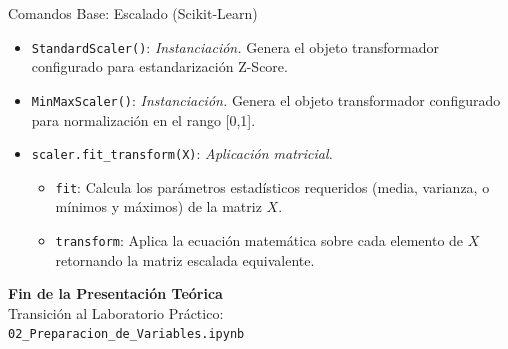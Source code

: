 \documentclass{beamer}
\begin{document}
\begin{frame}[fragile]{Comandos Base: Escalado (Scikit-Learn)}
    \begin{itemize}
        \item \verb|StandardScaler()|: \textit{Instanciación.} Genera el objeto transformador configurado para estandarización Z-Score.
        \item \verb|MinMaxScaler()|: \textit{Instanciación.} Genera el objeto transformador configurado para normalización en el rango [0,1].
        \item \verb|scaler.fit_transform(X)|: \textit{Aplicación matricial.} 
        \begin{itemize}
            \item \verb|fit|: Calcula los parámetros estadísticos requeridos (media, varianza, o mínimos y máximos) de la matriz $X$.
            \item \verb|transform|: Aplica la ecuación matemática sobre cada elemento de $X$ retornando la matriz escalada equivalente.
        \end{itemize}
    \end{itemize}
\end{frame}

\begin{frame}[fragile]
    \begin{center}
        \Large \textbf{Fin de la Presentación Teórica}\\
        \vspace{0.5cm}
        \normalsize Transición al Laboratorio Práctico:\\
        \vspace{0.2cm}
        \verb|02_Preparacion_de_Variables.ipynb|
    \end{center}
\end{frame}
\end{document}
